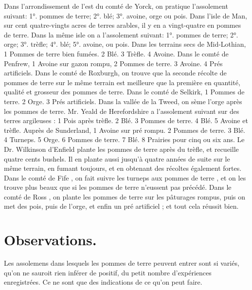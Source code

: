 Dans l'arrondissement de l'est du comté de Yorck, on pratique l'assolement suivant: 1°. pommes de terre; 2°. blé; 3°. avoine, orge ou pois.
Dans l'isle de Man, sur cent quatre-vingts acres de terres arables, il y en a vingt-quatre en pommes de terre. Dans la même isle on a l'assolement suivant: 1°. pommes de terre; 2°. orge; 3°. trèfle; 4°. blé; 5°. avoine, ou pois.
Dans les terrains secs de Mid-Lothian,
1 Pommes de terre bien fumées.
2 Blé.
3 Trèfle.
4 Avoine.
Dans le comté de Penfrew,
1 Avoine sur gazon rompu,
2 Pommes de terre.
3 Avoine.
4 Prés artificiels.
Dans le comté de Roxburgh, on trouve que la seconde récolte de pommes de terre sur le même terrain est meilleure que la première en quantité, qualité et grosseur des pommes de terre.
Dans le comté de Selkirk,\setcounter{page}{287} 1 Pommes de terre.
2 Orge.
3 Prés artificiels.
Dans la vallée de la Tweed, on sème l'orge après les pommes de terre.
Mr. Yeald de Herefordshire a l'assolement suivant sur des terres argileuses :
1 Pois après trèfle.
2 Blé.
3 Pommes de terre.
4 Blé.
5 Avoine et trèfle.
Auprès de Sunderland,
1 Avoine sur pré rompu.
2 Pommes de terre.
3 Blé.
4 Turneps.
5 Orge.
6 Pommes de terre.
7 Blé.
8 Prairies pour cinq ou six ans.
Le Dr. Wilkinson d'Enfield plante les pommes de terre après du trèfle, et recueille quatre cents bushels. Il en plante aussi jusqu'à quatre années de suite sur le même terrain, en fumant toujours, et en obtenant des récoltes également fortes.\setcounter{page}{288} Dans le comté de Fife , on fait suivre les turneps aux pommes de terre , et on les trouve plus beaux que si les pommes de terre n'eussent pas précédé.
Dans le comté de Ross , on plante les pommes de terre sur les pâturages rompus, puis on met des pois, puis de l'orge, et enfin un pré artificiel ; et tout cela réussit bien.
\section{Observations.}
Les assolemens dans lesquels les pommes de terre peuvent entrer sont si variés, qu'on ne sauroit rien inférer de positif, du petit nombre d'expériences enregistrées. Ce ne sont que des indications de ce qu'on peut faire.